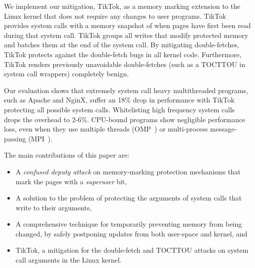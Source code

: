 \documentclass[conference]{IEEEtran}
\newcommand{\sysname}{TikTok}
\newcommand{\roughevaloverheadbad}{18\%}
\newcommand{\roughevaloverheadbetter}{2-6\%}
\begin{document}
We implement our mitigation, \sysname{}, as a memory marking extension to the
Linux kernel that does not require any changes to user programs.
\sysname{} provides system calls with a memory snapshot of when
pages have first been read during that system call.
\sysname{} groups all writes that modify protected memory and batches them at
the end of the system call. By mitigating
double-fetches, \sysname{} protects against the double-fetch bugs in all kernel
code. Furthermore, \sysname{} renders
previously unavoidable double-fetches (such as a TOCTTOU in system call
wrappers) completely benign. 


Our evaluation shows that extremely system call heavy multithreaded programs,
such as Apache and NginX, suffer an \roughevaloverheadbad{} drop in performance
with \sysname{} protecting all possible system calls. Whitelisting high
frequency system calls drops the overhead to \roughevaloverheadbetter{}. CPU-bound
programs show negligible performance loss, even when they
use multiple threads (OMP~\cite{dagum1998openmp}) or multi-process
message-passing (MPI~\cite{snir1998mpi}).



The main contributions of this paper are:

\begin{itemize}

\item A \emph{confused deputy attack} on memory-marking protection mechanisms
that mark the pages with a \emph{superuser} bit, %
\item A solution to the problem of protecting the arguments of system calls that
write to their arguments,
\item A comprehensive technique for temporarily preventing memory from being
      changed, by safely postponing updates from both user-space and kernel, and
\item \sysname{}, a mitigation for the double-fetch and TOCTTOU attacks on
      system call arguments in the Linux kernel.
\end{itemize}
\end{document}
